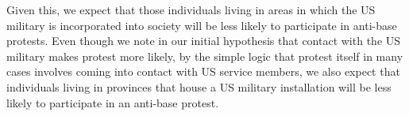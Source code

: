 Given this, we expect that those individuals living in areas in which the US military is incorporated into society will be less likely to participate in anti-base protests. Even though we note in our initial hypothesis that contact with the US military makes protest more likely, by the simple logic that protest itself in many cases involves coming into contact with US service members, we also expect that individuals living in provinces that house a US military installation will be less likely to participate in an anti-base protest. 








